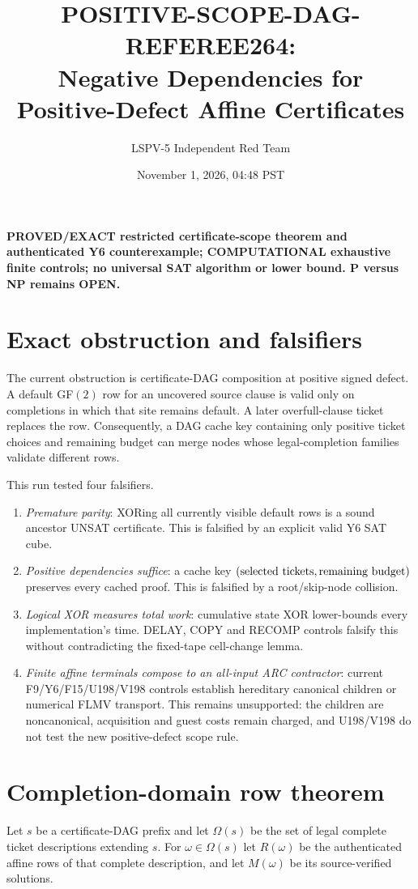 \documentclass[11pt]{article}
\title{POSITIVE-SCOPE-DAG-REFEREE264:\\Negative Dependencies for Positive-Defect Affine Certificates}
\author{LSPV-5 Independent Red Team}
\date{November 1, 2026, 04:48 PST}
\begin{document}
\maketitle

\noindent\textbf{PROVED/EXACT restricted certificate-scope theorem and authenticated Y6 counterexample; COMPUTATIONAL exhaustive finite controls; no universal SAT algorithm or lower bound. P versus NP remains OPEN.}

\section{Exact obstruction and falsifiers}
The current obstruction is certificate-DAG composition at positive signed defect.  A default GF$(2)$ row for an uncovered source clause is valid only on completions in which that site remains default.  A later overfull-clause ticket replaces the row.  Consequently, a DAG cache key containing only positive ticket choices and remaining budget can merge nodes whose legal-completion families validate different rows.

This run tested four falsifiers.
\begin{enumerate}
\item \emph{Premature parity}: XORing all currently visible default rows is a sound ancestor UNSAT certificate.  This is falsified by an explicit valid Y6 SAT cube.
\item \emph{Positive dependencies suffice}: a cache key $(\hbox{selected tickets},\hbox{remaining budget})$ preserves every cached proof.  This is falsified by a root/skip-node collision.
\item \emph{Logical XOR measures total work}: cumulative state XOR lower-bounds every implementation's time.  DELAY, COPY and RECOMP controls falsify this without contradicting the fixed-tape cell-change lemma.
\item \emph{Finite affine terminals compose to an all-input ARC contractor}: current F9/Y6/F15/U198/V198 controls establish hereditary canonical children or numerical FLMV transport.  This remains unsupported: the children are noncanonical, acquisition and guest costs remain charged, and U198/V198 do not test the new positive-defect scope rule.
\end{enumerate}

\section{Completion-domain row theorem}
Let $s$ be a certificate-DAG prefix and let $\Omega(s)$ be the set of legal complete ticket descriptions extending $s$.  For $\omega\in\Omega(s)$ let $R(\omega)$ be the authenticated affine rows of that complete description, and let $M(\omega)$ be its source-verified solutions.
\end{document}
